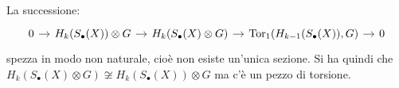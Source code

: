 \begin{theorem}
  La successione:
  \[
    \begin{tikzcd}[nodes = {column sep = 10pt}]
      0 \rar & H_k(S_\bullet(X)) \otimes G \rar & H_k(S_\bullet(X) \otimes G) \rar & \tor{H_{k-1}(S_\bullet(X)), G} \rar & 0
    \end{tikzcd}
  \]
  spezza in modo non naturale, cioè non esiste un'unica sezione. Si ha quindi che
  $ H_k(S_\bullet(X) \otimes G) \not \cong H_k(S_\bullet(X)) \otimes G $ ma c'è un pezzo
  di torsione. %
\end{theorem}
